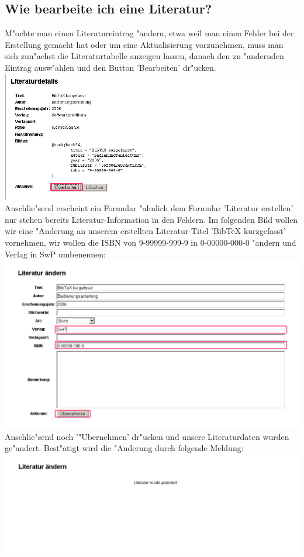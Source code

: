 \subsection{Wie bearbeite ich eine Literatur?}
M"ochte man einen Literatureintrag "andern, etwa weil man einen Fehler bei der Erstellung gemacht hat oder um eine Aktualisierung vorzunehmen, muss man sich zun"achst die Literaturtabelle anzeigen lassen, danach den zu "andernden Eintrag ausw"ahlen und den Button 'Bearbeiten' dr"ucken.\\
\includegraphics[scale=0.8]{bearb1}\\
Anschlie"send erscheint ein Formular "ahnlich dem Formular 'Literatur erstellen' nur stehen bereits Literatur-Information in den Feldern.
Im folgenden Bild wollen wir eine "Anderung an unserem erstellten Literatur-Titel 'BibTeX kurzgefasst' vornehmen, wir wollen die ISBN von 9-99999-999-9 in 0-00000-000-0 "andern und Verlag in SwP umbenennen:\\
\includegraphics[scale=0.8]{bearb2}\\
Anschlie"send noch '"Ubernehmen' dr"ucken und unsere Literaturdaten wurden ge"andert. Best"atigt wird die "Anderung durch folgende Meldung:\\
\includegraphics[scale=0.8]{bearb3}\\

